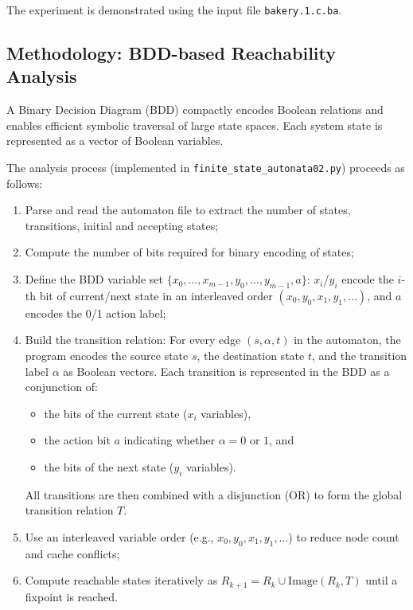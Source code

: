\documentclass{article}
\begin{document}
The experiment is demonstrated using the input file \texttt{bakery.1.c.ba}.



\subsection*{Methodology: BDD-based Reachability Analysis}

A Binary Decision Diagram (BDD) compactly encodes Boolean relations 
and enables efficient symbolic traversal of large state spaces.
Each system state is represented as a vector of Boolean variables.

The analysis process (implemented in \texttt{finite\_state\_autonata02.py}) proceeds as follows:

\begin{enumerate}
  \item Parse and read the automaton file to extract the number of states, transitions, initial and accepting states;
  \item Compute the number of bits required for binary encoding of states;
    \item Define the BDD variable set $\{x_0,\dots,x_{m-1},y_0,\dots,y_{m-1},a\}$:
          $x_i$/$y_i$ encode the $i$-th bit of current/next state in an interleaved order
          $(x_0,y_0,x_1,y_1,\dots)$, and $a$ encodes the 0/1 action label;
    \item Build the transition relation:
      For every edge $(s, \alpha, t)$ in the automaton, 
      the program encodes the source state $s$, the destination state $t$, 
      and the transition label $\alpha$ as Boolean vectors.
      Each transition is represented in the BDD as a conjunction of:
      \begin{itemize}
        \item the bits of the current state ($x_i$ variables),
        \item the action bit $a$ indicating whether $\alpha = 0$ or $1$, and
        \item the bits of the next state ($y_i$ variables).
      \end{itemize}
      All transitions are then combined with a disjunction (OR) to form
      the global transition relation $T$.
    \item Use an interleaved variable order (e.g., $x_0,y_0,x_1,y_1,\dots$) to reduce node count and cache conflicts;
    \item Compute reachable states iteratively as
          $R_{k+1}=R_k\cup\mathrm{Image}(R_k,T)$ until a fixpoint is reached.
    
\end{enumerate}
\end{document}
